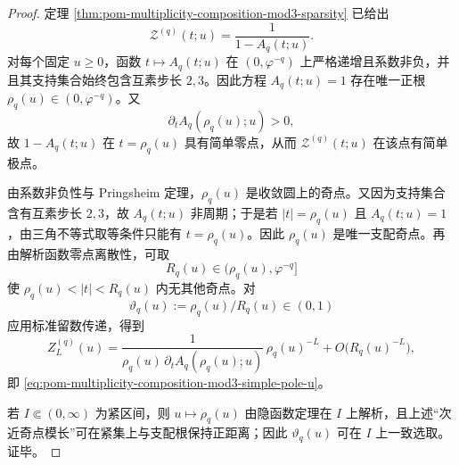 \begin{proof}
定理 \ref{thm:pom-multiplicity-composition-mod3-sparsity} 已给出
\[
\mathcal Z^{(q)}(t;u)=\frac{1}{1-A_q(t;u)}.
\]
对每个固定 \(u\ge 0\)，函数 \(t\mapsto A_q(t;u)\) 在 \((0,\varphi^{-q})\) 上严格递增且系数非负，并且其支持集合始终包含互素步长 \(2,3\)。因此方程 \(A_q(t;u)=1\) 存在唯一正根 \(\rho_q(u)\in(0,\varphi^{-q})\)。又
\[
\partial_tA_q(\rho_q(u);u)>0,
\]
故 \(1-A_q(t;u)\) 在 \(t=\rho_q(u)\) 具有简单零点，从而 \(\mathcal Z^{(q)}(t;u)\) 在该点有简单极点。

由系数非负性与 Pringsheim 定理，\(\rho_q(u)\) 是收敛圆上的奇点。又因为支持集合含有互素步长 \(2,3\)，故 \(A_q(t;u)\) 非周期；于是若 \(|t|=\rho_q(u)\) 且 \(A_q(t;u)=1\)，由三角不等式取等条件只能有 \(t=\rho_q(u)\)。因此 \(\rho_q(u)\) 是唯一支配奇点。再由解析函数零点离散性，可取
\[
R_q(u)\in\bigl(\rho_q(u),\varphi^{-q}\bigr]
\]
使 \(\rho_q(u)<|t|<R_q(u)\) 内无其他奇点。对
\[
\vartheta_q(u):=\rho_q(u)/R_q(u)\in(0,1)
\]
应用标准留数传递，得到
\[
Z_L^{(q)}(u)
=
\frac{1}{\rho_q(u)\,\partial_tA_q(\rho_q(u);u)}\,\rho_q(u)^{-L}
+ O\!\bigl(R_q(u)^{-L}\bigr),
\]
即 \eqref{eq:pom-multiplicity-composition-mod3-simple-pole-u}。

若 \(I\Subset(0,\infty)\) 为紧区间，则 \(u\mapsto \rho_q(u)\) 由隐函数定理在 \(I\) 上解析，且上述“次近奇点模长”可在紧集上与支配根保持正距离；因此 \(\vartheta_q(u)\) 可在 \(I\) 上一致选取。证毕。
\end{proof}

